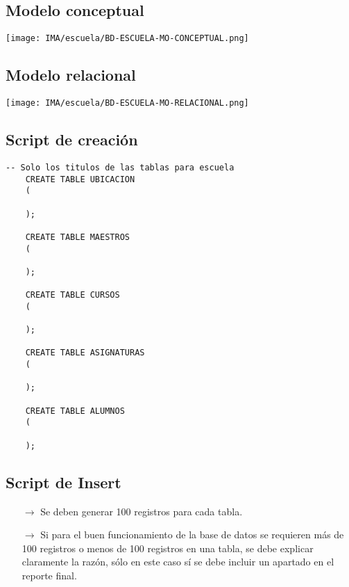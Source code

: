 \subsection{Modelo conceptual}
\begin{center}
    \texttt{[image: IMA/escuela/BD-ESCUELA-MO-CONCEPTUAL.png]}
\end{center}


\subsection{Modelo relacional}
\begin{center}
  \texttt{[image: IMA/escuela/BD-ESCUELA-MO-RELACIONAL.png]}
\end{center}


\subsection{Script de creación}
\begin{lstlisting}[caption={Tablas para la BdDatos}, label={lst:sql_estadios}]
    -- Solo los titulos de las tablas para escuela    
    CREATE TABLE UBICACION
    (
      
    );
    
    CREATE TABLE MAESTROS
    (
      
    );
    
    CREATE TABLE CURSOS
    (
      
    );
    
    CREATE TABLE ASIGNATURAS
    (
      
    );
    
    CREATE TABLE ALUMNOS
    (

    );    
\end{lstlisting}

\subsection{Script de Insert}
\begin{itemize}
    \item[$\rightarrow$] Se deben generar 100 registros para cada tabla.
    \item[$\rightarrow$] Si para el buen funcionamiento de la base de datos se requieren más de 100 registros o
            menos de 100 registros en una tabla, se debe explicar claramente la razón, sólo en este caso
            sí se debe incluir un apartado en el reporte final.
\end{itemize}

